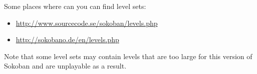 Some places where can you can find level sets:
\begin{itemize}
\item \url{http://www.sourcecode.se/sokoban/levels.php}
\item \url{http://sokobano.de/en/levels.php}
\end{itemize}
Note that some level sets may contain levels that are too large for this
version of Sokoban and are unplayable as a result.

